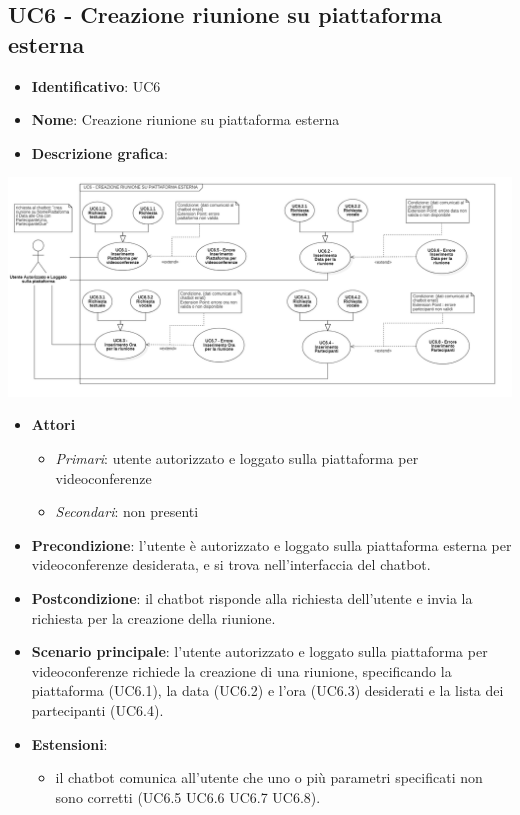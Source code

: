 \subsection{UC6 - Creazione riunione su piattaforma esterna}
\begin{itemize}
    \item \textbf{Identificativo}: UC6
    \item \textbf{Nome}: Creazione riunione su piattaforma esterna
    \item \textbf{Descrizione grafica}:
\end{itemize}
\begin{center}
    \includegraphics{images/UC6.png} 
\end{center}
 \begin{itemize}
    \item \textbf{Attori}
 \begin{itemize} 
    \item \textit{Primari}: utente autorizzato e loggato sulla piattaforma per videoconferenze
    \item \textit{Secondari}: non presenti
 \end{itemize}
 \item \textbf{Precondizione}: l'utente è autorizzato e loggato sulla piattaforma esterna per videoconferenze desiderata, e si trova nell'interfaccia del chatbot.
 \item \textbf{Postcondizione}: il chatbot risponde alla richiesta dell'utente e invia la richiesta per la creazione della riunione.
 \item \textbf{Scenario principale}: l'utente autorizzato e loggato sulla piattaforma per videoconferenze richiede la creazione di una riunione, specificando la piattaforma (UC6.1), la data (UC6.2) e l'ora (UC6.3) desiderati e la lista dei partecipanti (UC6.4).
 \item \textbf{Estensioni}: 
 \begin{itemize} 
    \item il chatbot comunica all'utente che uno o più parametri specificati non sono corretti (UC6.5 UC6.6 UC6.7 UC6.8).
 \end{itemize}
\end{itemize}
\newpage

